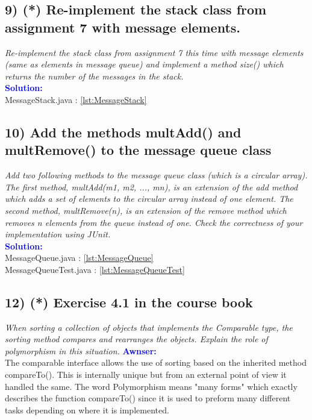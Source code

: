 \documentclass[main.tex]{subfiles}
\begin{document}
\subsection*{9) (*) Re-implement the stack class from assignment 7 with message elements.}
\textit{Re-implement the stack class from assignment 7 this time with message elements (same as
elements in message queue) and implement a method size() which returns the number of the
messages in the stack.}\\
\indent \textbf{\textcolor{blue}{Solution:}} \\
MessageStack.java : \ref{lst:MessageStack} \\


\subsection*{10) Add the methods multAdd() and multRemove() to the message queue class}
\textit{Add two following methods to the message queue class (which is a circular array). The first
method, multAdd(m1, m2, ..., mn), is an extension of the add method which adds a set of
elements to the circular array instead of one element. The second method, multRemove(n), is an
extension of the remove method which removes n elements from the queue instead of one. Check
the correctness of your implementation using JUnit.}\\
\indent \textbf{\textcolor{blue}{Solution:}} \\
MessageQueue.java : \ref{lst:MessageQueue} \\
MessageQueueTest.java : \ref{lst:MessageQueueTest}


\subsection*{12) (*) Exercise 4.1 in the course book}
\textit{When sorting a collection of objects that implements the
Comparable type, the sorting method compares and rearranges the objects. Explain the role of
polymorphism in this situation.}
\indent \textbf{\textcolor{blue}{Awnser:}} \\
    The comparable interface allows the use of sorting based on the inherited method compareTo().
    This is internally unique but from an external point of view it handled the same.
    The word Polymorphism means "many forms" which exactly describes the function compareTo()
    since it is used to preform many different tasks depending on where it is implemented.
\end{document}
